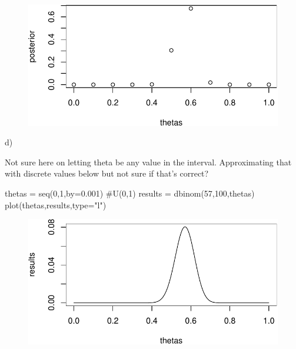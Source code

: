 \documentclass[
  letterpaper,
  DIV=11,
  numbers=noendperiod]{scrartcl}
\newenvironment{Shaded}{\begin{snugshade}}{\end{snugshade}}
\newcommand{\AttributeTok}[1]{\textcolor[rgb]{0.40,0.45,0.13}{#1}}
\newcommand{\CommentTok}[1]{\textcolor[rgb]{0.37,0.37,0.37}{#1}}
\newcommand{\DecValTok}[1]{\textcolor[rgb]{0.68,0.00,0.00}{#1}}
\newcommand{\FloatTok}[1]{\textcolor[rgb]{0.68,0.00,0.00}{#1}}
\newcommand{\FunctionTok}[1]{\textcolor[rgb]{0.28,0.35,0.67}{#1}}
\newcommand{\NormalTok}[1]{\textcolor[rgb]{0.00,0.23,0.31}{#1}}
\newcommand{\OtherTok}[1]{\textcolor[rgb]{0.00,0.23,0.31}{#1}}
\newcommand{\StringTok}[1]{\textcolor[rgb]{0.13,0.47,0.30}{#1}}
\begin{document}
\begin{figure}[H]

{\centering \includegraphics{hw2_602_files/figure-pdf/unnamed-chunk-2-1.pdf}

}

\end{figure}

d)

Not sure here on letting theta be any value in the interval.
Approximating that with discrete values below but not sure if that's
correct?

\begin{Shaded}
\begin{Highlighting}[]
\NormalTok{thetas }\OtherTok{=} \FunctionTok{seq}\NormalTok{(}\DecValTok{0}\NormalTok{,}\DecValTok{1}\NormalTok{,}\AttributeTok{by=}\FloatTok{0.001}\NormalTok{) }\CommentTok{\#U(0,1)}
\NormalTok{results }\OtherTok{=} \FunctionTok{dbinom}\NormalTok{(}\DecValTok{57}\NormalTok{,}\DecValTok{100}\NormalTok{,thetas)}
\FunctionTok{plot}\NormalTok{(thetas,results,}\AttributeTok{type=}\StringTok{"l"}\NormalTok{)}
\end{Highlighting}
\end{Shaded}

\begin{figure}[H]

{\centering \includegraphics{hw2_602_files/figure-pdf/unnamed-chunk-3-1.pdf}

}

\end{figure}
\end{document}
